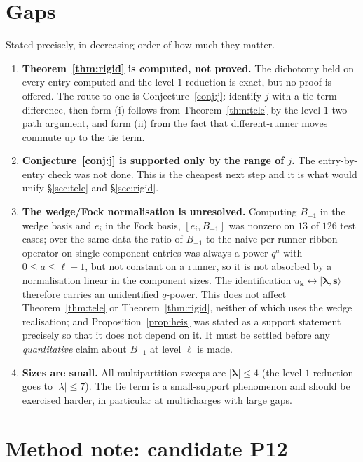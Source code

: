 \documentclass[11pt]{article}
\theoremstyle{definition}
\theoremstyle{remark}
\newcommand{\bl}{\boldsymbol{\lambda}}
\newcommand{\bs}{\mathbf{s}}
\newcommand{\ket}[1]{\lvert #1 \rangle}
\begin{document}
\section{Gaps}\label{sec:gaps}

Stated precisely, in decreasing order of how much they matter.

\begin{enumerate}
\item \textbf{Theorem~\ref{thm:rigid} is computed, not proved.} The dichotomy held on
every entry computed and the level-$1$ reduction is exact, but no proof is offered. The
route to one is Conjecture~\ref{conj:j}: identify $j$ with a tie-term difference, then
form (i) follows from Theorem~\ref{thm:tele} by the level-$1$ two-path argument, and
form (ii) from the fact that different-runner moves commute up to the tie term.

\item \textbf{Conjecture~\ref{conj:j} is supported only by the range of $j$.} The
entry-by-entry check was not done. This is the cheapest next step and it is what would
unify \S\ref{sec:tele} and \S\ref{sec:rigid}.

\item \textbf{The wedge/Fock normalisation is unresolved.} Computing $B_{-1}$ in the
wedge basis and $e_i$ in the Fock basis, $[e_i,B_{-1}]$ was nonzero on $13$ of $126$
test cases; over the same data the ratio of $B_{-1}$ to the naive per-runner ribbon
operator on single-component entries was always a power $q^{a}$ with
$0\le a\le\ell-1$, but not constant on a runner, so it is not absorbed by a
normalisation linear in the component sizes. The identification
$u_{\mathbf k}\leftrightarrow\ket{\bl,\bs}$ therefore carries an unidentified
$q$-power. This does not affect Theorem~\ref{thm:tele} or Theorem~\ref{thm:rigid},
neither of which uses the wedge realisation; and Proposition~\ref{prop:heis} was stated
as a support statement precisely so that it does not depend on it. It must be settled
before any \emph{quantitative} claim about $B_{-1}$ at level $\ell$ is made.

\item \textbf{Sizes are small.} All multipartition sweeps are $|\bl|\le4$
(the level-$1$ reduction goes to $|\lambda|\le7$). The tie term is a
small-support phenomenon and should be exercised harder, in particular at multicharges
with large gaps.
\end{enumerate}

\section{Method note: candidate P12}
\end{document}
